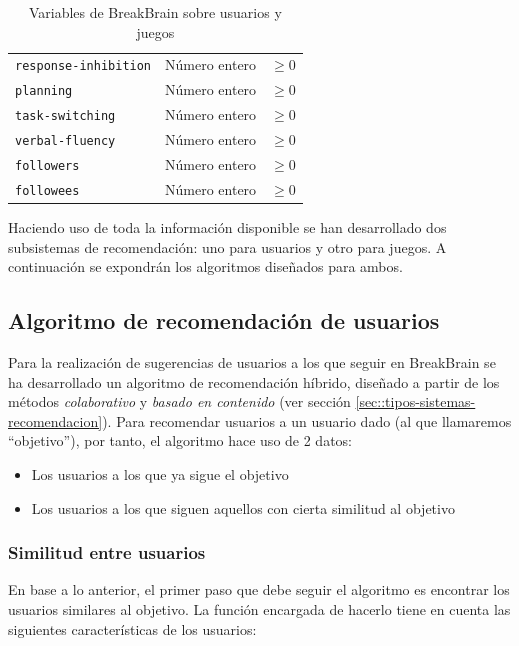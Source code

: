 \begin{table}
\begin{center}
\begin{tabular}{lcc}
      {\tt response-inhibition} & Número entero & $\geq 0$ \\
      {\tt planning} & Número entero & $\geq 0$ \\
      {\tt task-switching} & Número entero & $\geq 0$ \\
      {\tt verbal-fluency} & Número entero & $\geq 0$ \\
      {\tt followers} & Número entero & $\geq 0$ \\
      {\tt followees} & Número entero & $\geq 0$ \\
      \hline
    \end{tabular}
  \end{center}
  \caption{Variables de BreakBrain sobre usuarios y juegos}
  \label{table:variables-resumen}
\end{table}

Haciendo uso de toda la información disponible se han desarrollado dos subsistemas de recomendación: uno para usuarios y otro para juegos. A continuación se expondrán los algoritmos diseñados para ambos.

\subsection{Algoritmo de recomendación de usuarios}

Para la realización de sugerencias de usuarios a los que seguir en BreakBrain se ha desarrollado un algoritmo de recomendación híbrido, diseñado a partir de los métodos {\it colaborativo} y {\it basado en contenido} (ver sección \ref{sec::tipos-sistemas-recomendacion}). Para recomendar usuarios a un usuario dado (al que llamaremos ``objetivo''), por tanto, el algoritmo hace uso de 2 datos:

\begin{itemize}
\item Los usuarios a los que ya sigue el objetivo
\item Los usuarios a los que siguen aquellos con cierta similitud al objetivo
\end{itemize}

\subsubsection{Similitud entre usuarios}

En base a lo anterior, el primer paso que debe seguir el algoritmo es encontrar los usuarios similares al objetivo. La función encargada de hacerlo tiene en cuenta las siguientes características de los usuarios:

